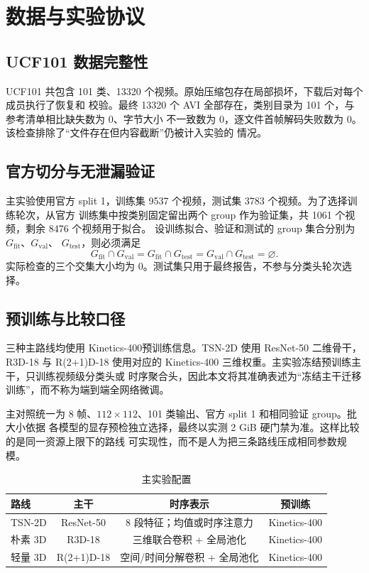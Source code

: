 \section{数据与实验协议}

\subsection{UCF101 数据完整性}

UCF101 共包含 101 类、13320 个视频。原始压缩包存在局部损坏，下载后对每个成员执行了恢复和
校验。最终 13320 个 AVI 全部存在，类别目录为 101 个，与参考清单相比缺失数为 0、字节大小
不一致数为 0，逐文件首帧解码失败数为 0。该检查排除了“文件存在但内容截断”仍被计入实验的
情况。

\subsection{官方切分与无泄漏验证}

主实验使用官方 split 1，训练集 9537 个视频，测试集 3783 个视频。为了选择训练轮次，从官方
训练集中按类别固定留出两个 group 作为验证集，共 1061 个视频，剩余 8476 个视频用于拟合。
设训练拟合、验证和测试的 group 集合分别为 $G_{\mathrm{fit}}$、$G_{\mathrm{val}}$、
$G_{\mathrm{test}}$，则必须满足
\begin{equation}
  G_{\mathrm{fit}}\cap G_{\mathrm{val}}
  =G_{\mathrm{fit}}\cap G_{\mathrm{test}}
  =G_{\mathrm{val}}\cap G_{\mathrm{test}}
  =\varnothing .
  \label{eq:group}
\end{equation}
实际检查的三个交集大小均为 0。测试集只用于最终报告，不参与分类头轮次选择。

\subsection{预训练与比较口径}

三种主路线均使用 Kinetics-400\cite{kinetics}预训练信息。TSN-2D 使用 ResNet-50 二维骨干\cite{imagenet}，R3D-18 与
R(2+1)D-18 使用对应的 Kinetics-400 三维权重。主实验冻结预训练主干，只训练视频级分类头或
时序聚合头，因此本文将其准确表述为“冻结主干迁移训练”，而不称为端到端全网络微调。

主对照统一为 8 帧、$112\times112$、101 类输出、官方 split 1 和相同验证 group。批大小依据
各模型的显存预检独立选择，最终以实测 2 GiB 硬门禁为准。这样比较的是同一资源上限下的路线
可实现性，而不是人为把三条路线压成相同参数规模。

\begin{table}[H]
  \centering
  \caption{主实验配置}
  \label{tab:main_protocol}
  \begin{tabular}{lccc}
    \toprule
    路线 & 主干 & 时序表示 & 预训练 \\
    \midrule
    TSN-2D & ResNet-50 & 8 段特征；均值或时序注意力 & Kinetics-400 \\
    朴素 3D & R3D-18 & 三维联合卷积 + 全局池化 & Kinetics-400 \\
    轻量 3D & R(2+1)D-18 & 空间/时间分解卷积 + 全局池化 & Kinetics-400 \\
    \bottomrule
  \end{tabular}
\end{table}
